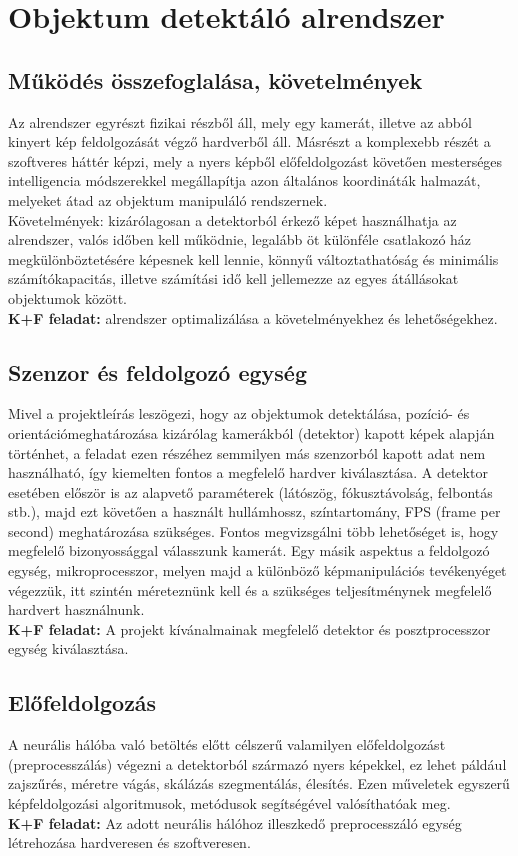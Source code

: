 \documentclass{article}
\begin{document}
\section{Objektum detektáló alrendszer}
\subsection{Működés összefoglalása, követelmények}
Az alrendszer egyrészt fizikai részből áll, mely egy kamerát, illetve az abból kinyert kép feldolgozását végző hardverből áll.
 Másrészt a komplexebb részét a szoftveres háttér képzi, mely a nyers képből előfeldolgozást követően mesterséges intelligencia módszerekkel megállapítja azon általános koordináták halmazát, melyeket átad az objektum manipuláló rendszernek.\vspace{5pt}\\
Követelmények: kizárólagosan a detektorból érkező képet használhatja az alrendszer, valós időben kell működnie, legalább öt különféle csatlakozó ház megkülönböztetésére képesnek kell lennie, könnyű változtathatóság és minimális számítókapacitás, illetve számítási idő kell jellemezze
az egyes átállásokat objektumok között.\vspace{5pt}\\
 \textbf{K+F feladat:} alrendszer optimalizálása a követelményekhez és lehetőségekhez.
\subsection{Szenzor és feldolgozó egység}
Mivel a projektleírás leszögezi, hogy az objektumok detektálása, pozíció- és orientációmeghatározása
kizárólag kamerákból (detektor) kapott képek alapján történhet, a feladat ezen részéhez semmilyen
más szenzorból kapott adat nem használható, így kiemelten fontos a megfelelő hardver
kiválasztása. A detektor esetében először is az alapvető paraméterek (látószög, fókusztávolság, felbontás stb.),
 majd ezt követően a használt hullámhossz, színtartomány, FPS (frame per second) meghatározása szükséges.
 Fontos megvizsgálni több lehetőséget is, hogy megfelelő bizonyossággal válasszunk kamerát.
 Egy másik aspektus a feldolgozó egység, mikroprocesszor, melyen majd a különböző képmanipulációs
 tevékenyéget végezzük, itt szintén méreteznünk kell és a szükséges teljesítménynek megfelelő
hardvert használnunk.\vspace{5pt}\\
\textbf{K+F feladat: }A projekt kívánalmainak megfelelő detektor és posztprocesszor egység kiválasztása.
\subsection{Előfeldolgozás}
A neurális hálóba való betöltés előtt célszerű valamilyen előfeldolgozást (preprocesszálás)
végezni a detektorból származó nyers képekkel, ez lehet páldául zajszűrés, méretre vágás, skálázás
szegmentálás, élesítés. Ezen műveletek egyszerű képfeldolgozási algoritmusok, metódusok
segítségével valósíthatóak meg.\vspace{5pt}\\
\textbf{K+F feladat: }Az adott neurális hálóhoz illeszkedő preprocesszáló egység létrehozása
hardveresen és szoftveresen.
\end{document}

